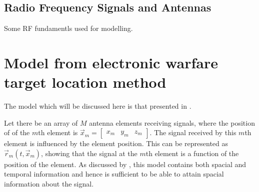 \subsection{Radio Frequency Signals and Antennas}
Some RF fundamentls used for modelling.

\section{Model from electronic warfare target location method}

The model which will be discussed here is that presented in \cite{poisel2012electronic}.  

Let there be an array of $M$ antenna elements receiving signals, where the position of of the \(m\)th element is \(\vec{x}_{m} = \begin{bmatrix}x_m & y_m & z_m \end{bmatrix}\).
The signal received by this \(m\)th element is influenced by the element position. 
This can be represented as \(\vec{r}_m(t, \vec{x}_m)\), showing that the signal at the \(m\)th element is a function of the position of the element.
As discussed by \cite{krim1996two}, this model contains both spacial and temporal information and hence is sufficient to be able to attain spacial information about the signal. 

